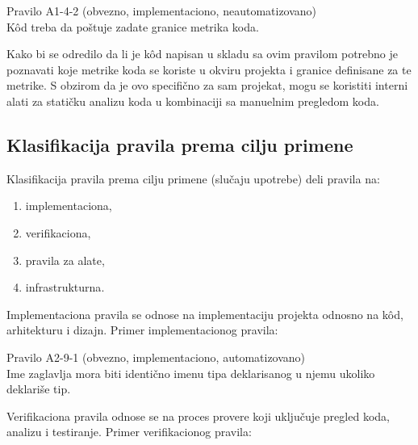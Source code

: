 \documentclass[12pt,oneside]{memoir}
\begin{document}
\begin{center}
\begin{tcolorbox}
Pravilo A1-4-2 (obvezno, implementaciono, neautomatizovano) \\
K\^{o}d treba da poštuje zadate granice metrika koda.
\end{tcolorbox}
\end{center}


  Kako bi se odredilo da li je k\^{o}d napisan u skladu sa ovim pravilom potrebno je poznavati koje metrike koda se koriste u okviru projekta i
  granice definisane za te metrike. S obzirom da je ovo specifično za sam projekat, mogu se koristiti interni alati za statičku analizu koda u kombinaciji
  sa manuelnim pregledom koda. 

\subsection{Klasifikacija pravila prema cilju primene}
Klasifikacija pravila prema cilju primene (slučaju upotrebe) deli pravila na:

\begin{enumerate}
  \item{implementaciona},
  \item{verifikaciona},
  \item{pravila za alate},
  \item{infrastrukturna}.
\end{enumerate}

Implementaciona pravila se odnose na implementaciju projekta odnosno na k\^{o}d, arhitekturu i dizajn.
Primer implementacionog pravila:

\begin{center}
\begin{tcolorbox}
Pravilo A2-9-1 (obvezno, implementaciono, automatizovano) \\
Ime zaglavlja mora biti identično imenu tipa deklarisanog u njemu ukoliko deklariše tip.
\end{tcolorbox}
\end{center}


Verifikaciona pravila odnose se na proces provere koji uključuje pregled koda, analizu i testiranje.
Primer verifikacionog pravila:
\end{document}
